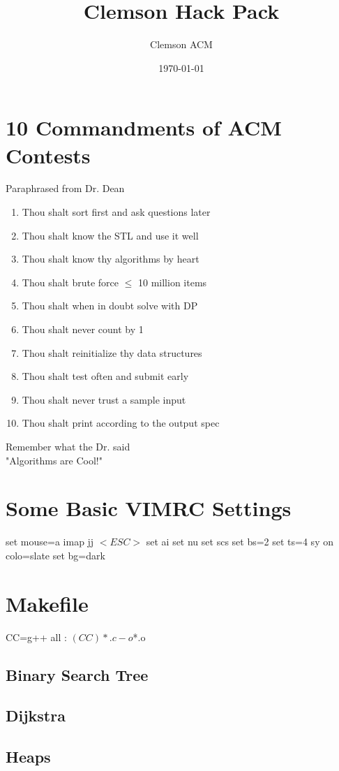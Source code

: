 \documentclass[letterpaper, 10pt]{report}
\title{Clemson Hack Pack}
\author{Clemson ACM}
\date{\today}
\begin{document}
\maketitle

\begingroup
\let\clearpage\relax
\chapter*{10 Commandments of ACM Contests}
\begin{center}Paraphrased from Dr. Dean\end{center}
\begin{multicols}{2}
\begin{enumerate}
    \item Thou shalt sort first and ask questions later
    \item Thou shalt know the STL and use it well
    \item Thou shalt know thy algorithms by heart
    \item Thou shalt brute force $\leq$ 10 million items
    \item Thou shalt when in doubt solve with DP
    \item Thou shalt never count by 1
    \item Thou shalt reinitialize thy data structures
    \item Thou shalt test often and submit early
    \item Thou shalt never trust a sample input
    \item Thou shalt print according to the output spec
\end{enumerate}
\end{multicols}
\begin{center}
Remember what the Dr. said\\
"Algorithms are Cool!"
\end{center}

\chapter*{Some Basic VIMRC Settings}
\begin{multicols}{2}
\begin{code}
set mouse=a
imap jj $<ESC>$
set ai
set nu
set scs
set bs=2
set ts=4
sy on
colo=slate
set bg=dark
\end{code}
\end{multicols}

\chapter*{Makefile}
\begin{code}
CC=g++
all :
    $(CC) *.c -o $*.o
\end{code}
\endgroup


\tableofcontents


\section{Binary Search Tree}
\section{Dijkstra}
\section{Heaps}
\end{document}
